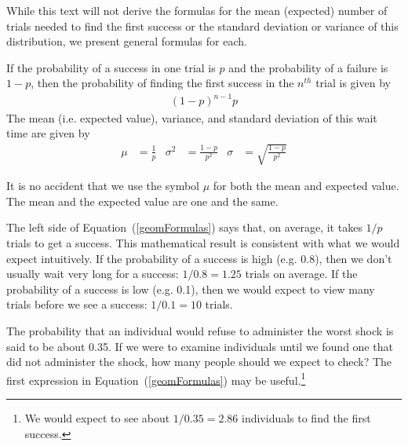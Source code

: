 While this text will not derive the formulas for the mean (expected) number of trials needed to find the first success or the standard deviation or variance of this distribution, we present general formulas for each.

\begin{termBox}{
If the probability of a success in one trial is $p$ and the probability of a failure is $1-p$, then the probability of finding the first success in the $n^{th}$ trial is given by\vspace{-1.5mm}
\begin{eqnarray}
(1-p)^{n-1}p
\end{eqnarray}
The mean (i.e. expected value), variance, and standard deviation of this wait time are given by\vspace{-2.5mm}
\begin{align}
\mu &= \frac{1}{p}
	&\sigma^2&=\frac{1-p}{p^2}
	&\sigma &= \sqrt{\frac{1-p}{p^2}}
\label{geomFormulas}
\end{align}}
\end{termBox}

It is no accident that we use the symbol $\mu$ for both the mean and expected value. The mean and the expected value are one and the same.

The left side of Equation~(\ref{geomFormulas}) says that, on average, it takes $1/p$ trials to get a success. This mathematical result is consistent with what we would expect intuitively. If the probability of a success is high (e.g. 0.8), then we don't usually wait very long for a success: $1/0.8 = 1.25$ trials on average. If the probability of a success is low (e.g. 0.1), then we would expect to view many trials before we see a success: $1/0.1 = 10$ trials.

\begin{exercise}
The probability that an individual would refuse to administer the worst shock is said to be about 0.35. If we were to examine individuals until we found one that did not administer the shock, how many people should we expect to check? The first expression in Equation~(\ref{geomFormulas}) may be useful.\footnote{We would expect to see about $1/0.35 = 2.86$ individuals to find the first success.}
\end{exercise}

